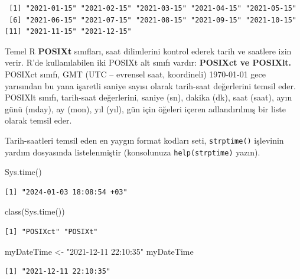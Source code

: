 \documentclass[
  letterpaper,
  DIV=11,
  numbers=noendperiod]{scrreprt}
\newenvironment{Shaded}{\begin{snugshade}}{\end{snugshade}}
\newcommand{\FunctionTok}[1]{\textcolor[rgb]{0.28,0.35,0.67}{#1}}
\newcommand{\NormalTok}[1]{\textcolor[rgb]{0.00,0.23,0.31}{#1}}
\newcommand{\OtherTok}[1]{\textcolor[rgb]{0.00,0.23,0.31}{#1}}
\newcommand{\StringTok}[1]{\textcolor[rgb]{0.13,0.47,0.30}{#1}}
\begin{document}
\begin{verbatim}
 [1] "2021-01-15" "2021-02-15" "2021-03-15" "2021-04-15" "2021-05-15"
 [6] "2021-06-15" "2021-07-15" "2021-08-15" "2021-09-15" "2021-10-15"
[11] "2021-11-15" "2021-12-15"
\end{verbatim}

Temel R \textbf{POSIXt} sınıfları, saat dilimlerini kontrol ederek tarih
ve saatlere izin verir. R'de kullanılabilen iki POSIXt alt sınıfı
vardır: \textbf{POSIXct ve POSIXlt.} POSIXct sınıfı, GMT (UTC --
evrensel saat, koordineli) 1970-01-01 gece yarısından bu yana işaretli
saniye sayısı olarak tarih-saat değerlerini temsil eder. POSIXlt sınıfı,
tarih-saat değerlerini, saniye (sn), dakika (dk), saat (saat), ayın günü
(mday), ay (mon), yıl (yıl), gün için öğeleri içeren adlandırılmış bir
liste olarak temsil eder.

Tarih-saatleri temsil eden en yaygın format kodları seti,
\texttt{strptime()} işlevinin yardım dosyasında listelenmiştir
(konsolunuza \texttt{help(strptime)} yazın).

\begin{Shaded}
\begin{Highlighting}[]
\FunctionTok{Sys.time}\NormalTok{()}
\end{Highlighting}
\end{Shaded}

\begin{verbatim}
[1] "2024-01-03 18:08:54 +03"
\end{verbatim}

\begin{Shaded}
\begin{Highlighting}[]
\FunctionTok{class}\NormalTok{(}\FunctionTok{Sys.time}\NormalTok{())}
\end{Highlighting}
\end{Shaded}

\begin{verbatim}
[1] "POSIXct" "POSIXt" 
\end{verbatim}

\begin{Shaded}
\begin{Highlighting}[]
\NormalTok{myDateTime }\OtherTok{\textless{}{-}} \StringTok{"2021{-}12{-}11 22:10:35"}
\NormalTok{myDateTime}
\end{Highlighting}
\end{Shaded}

\begin{verbatim}
[1] "2021-12-11 22:10:35"
\end{verbatim}
\end{document}
